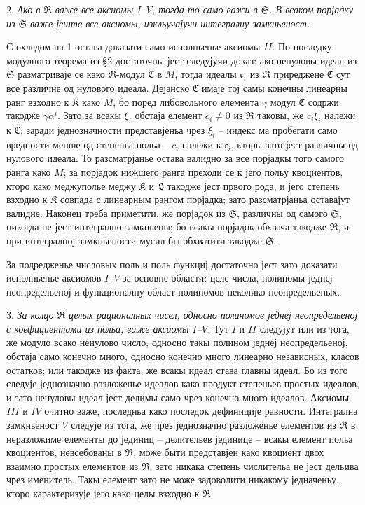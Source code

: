 ﻿\documentclass[11pt]{article}
\providecommand{\mR}{\mathfrak{R}}
\providecommand{\mK}{\mathfrak{K}}
\providecommand{\mL}{\mathfrak{L}}
\providecommand{\mS}{\mathfrak{S}}
\providecommand{\mC}{\mathfrak{C}}
\providecommand{\mc}{\mathfrak{c}}
\begin{document}
2. {\itshape Ако в $\mR$ важе все аксиомы $I$--$V$, тогда то само важи в $\mS$. В всаком порјадку из $\mS$ важе јеште все аксиомы, изкльучајучи интегралну замкньеност.}

С охледом на 1 остава доказати само исполньенье аксиомы $II$. По последку модулного теорема из §2 достаточны јест следујучи доказ: ако ненуловы идеал из $\mS$ разматриваје се како $\mR$-модул $\mC$ в $M$, тогда идеалы $\mc_i$ из $\mR$ приреджене $\mC$ сут все различне од нулового идеала. Дејанско $\mC$ имаје тој самы конечны линеарны ранг взходно к $\mK$ како $M$, бо поред либовольного елемента $\gamma$ модул $\mC$ содржи такодже $\gamma\alpha^i$. Зато за всакы $\xi_i$ обстаја елемент $c_i\ne0$ из $\mR$ таковы, же $c_i\xi_i$ належи к $\mC$; заради једнозначности представјеньа чрез $\xi_i$ -- индекс ма пробегати само вредности менше од степеньа польа -- $c_i$ належи к $\mc_i$, кторы зато јест различны од нулового идеала. То разсматрјанье остава валидно за все порјадкы того самого ранга како $M$; за порјадок нижшего ранга преходи се к јего польу квоциентов, кторо како меджуполье меджу $\mK$ и $\mL$ такодже јест првого рода, и јего степень взходно к $\mK$ совпада с линеарным рангом порјадка; зато разсматрјаньа оставајут валидне. Наконец треба приметити, же порјадок из $\mS$, различны од самого $\mS$, никогда не јест интегрално замкньены; бо всакы порјадок обхвача такодже $\mR$, и при интегралној замкньености мусил бы обхватити такодже $\mS$.

За подредженье числовых поль и поль функциј достаточно јест зато доказати исполньенье аксиомов $I$--$V$ за основне области: целе числа, полиномы једнеј неопредельеној и функционалну област полиномов неколико неопредельеных.

3. {\itshape За колцо $\mR$ целых рационалных чисел, односно полиномов једнеј неопредельеној с коефициентами из польа, важе аксиомы $I$--$V$.} Тут $I$ и $II$ следујут или из тога, же модуло всако ненулово число, односно такы полином једнеј неопредельеној, обстаја само конечно много, односно конечно много линеарно независных, класов остатков; или такодже из факта, же всакы идеал става главны идеал. Бо из того следује једнозначно разложенье идеалов како продукт степеньев простых идеалов, и зато ненуловы идеал јест делимы само чрез конечно много идеалов. Аксиомы $III$ и $IV$ очитно важе, последньа како последок дефиниције равности. Интегрална замкньеност $V$ следује из тога, же чрез једнозначно разложенье елементов из $\mR$ в неразложиме елементы до јединиц -- делительев јединице -- всакы елемент польа квоциентов, невсебованы в $\mR$, може быти представјен како квоциент двох взаимно простых елементов из $\mR$; зато никака степень числительа не јест дельива чрез именитель. Такы елемент зато не може задоволити никакому једначеньу, кторо карактеризује јего како целы взходно к $\mR$.
\end{document}
